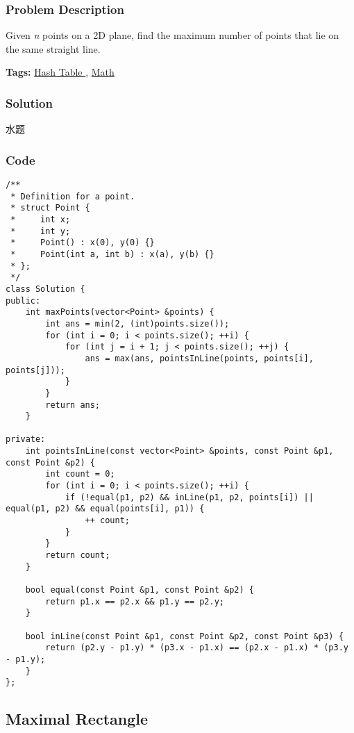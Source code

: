 \documentclass{article}
\begin{document}
\begin{CJK*}{UTF8}{gkai}
\subsubsection*{Problem Description}
Given \emph{n} points on a 2D plane, find the maximum number of points that lie on the same straight line.


\textbf{Tags: }
\hyperref[ Hash Table ]{ Hash Table },  \hyperref[ Math ]{ Math }



\subsubsection*{Solution}
水题

\subsubsection*{Code}
\begin{lstlisting}
/**
 * Definition for a point.
 * struct Point {
 *     int x;
 *     int y;
 *     Point() : x(0), y(0) {}
 *     Point(int a, int b) : x(a), y(b) {}
 * };
 */
class Solution {
public:
    int maxPoints(vector<Point> &points) {
        int ans = min(2, (int)points.size());
        for (int i = 0; i < points.size(); ++i) {
            for (int j = i + 1; j < points.size(); ++j) {
                ans = max(ans, pointsInLine(points, points[i], points[j]));
            }
        }
        return ans;
    }
    
private:
    int pointsInLine(const vector<Point> &points, const Point &p1, const Point &p2) {
        int count = 0;
        for (int i = 0; i < points.size(); ++i) {
            if (!equal(p1, p2) && inLine(p1, p2, points[i]) || equal(p1, p2) && equal(points[i], p1)) {
                ++ count;
            }
        }
        return count;
    }
    
    bool equal(const Point &p1, const Point &p2) {
        return p1.x == p2.x && p1.y == p2.y;
    }
    
    bool inLine(const Point &p1, const Point &p2, const Point &p3) {
        return (p2.y - p1.y) * (p3.x - p1.x) == (p2.x - p1.x) * (p3.y - p1.y);
    }
}; 
\end{lstlisting}


\subsection{ Maximal Rectangle }
\label{ Maximal Rectangle }


\end{CJK*}
\end{document}
